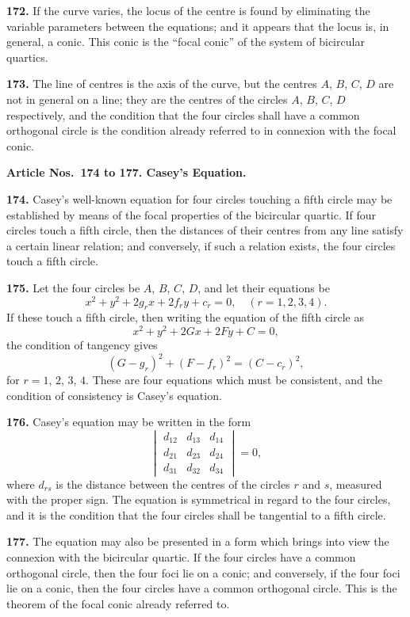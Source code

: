 \documentclass[12pt,a4paper]{article}
\theoremstyle{definition}
\begin{document}
\noindent\textbf{172.} If the curve varies, the locus of the centre is found by eliminating the
variable parameters between the equations; and it appears that the locus is, in general,
a conic. This conic is the ``focal conic'' of the system of bicircular quartics.

\newpage
\noindent\textbf{173.} The line of centres is the axis of the curve, but the centres $A$, $B$, $C$, $D$
are not in general on a line; they are the centres of the circles $A$, $B$, $C$, $D$ respectively,
and the condition that the four circles shall have a common orthogonal circle is the
condition already referred to in connexion with the focal conic.

\vspace{0.5em}
\noindent\textbf{Article Nos.~174 to 177. Casey's Equation.}

\vspace{0.3em}
\noindent\textbf{174.} Casey's well-known equation for four circles touching a fifth circle may
be established by means of the focal properties of the bicircular quartic. If four circles
touch a fifth circle, then the distances of their centres from any line satisfy a certain
linear relation; and conversely, if such a relation exists, the four circles touch a fifth circle.

\noindent\textbf{175.} Let the four circles be $A$, $B$, $C$, $D$, and let their equations be
\[
x^2 + y^2 + 2g_rx + 2f_ry + c_r = 0, \quad (r = 1, 2, 3, 4).
\]
If these touch a fifth circle, then writing the equation of the fifth circle as
\[
x^2 + y^2 + 2Gx + 2Fy + C = 0,
\]
the condition of tangency gives
\[
(G - g_r)^2 + (F - f_r)^2 = (C - c_r)^2,
\]
for $r = 1$, $2$, $3$, $4$. These are four equations which must be consistent, and the condition
of consistency is Casey's equation.

\newpage
\noindent\textbf{176.} Casey's equation may be written in the form
\[
\begin{vmatrix}
d_{12} & d_{13} & d_{14} \\
d_{21} & d_{23} & d_{24} \\
d_{31} & d_{32} & d_{34}
\end{vmatrix}
= 0,
\]
where $d_{rs}$ is the distance between the centres of the circles $r$ and $s$, measured with
the proper sign. The equation is symmetrical in regard to the four circles, and it is
the condition that the four circles shall be tangential to a fifth circle.

\noindent\textbf{177.} The equation may also be presented in a form which brings into view
the connexion with the bicircular quartic. If the four circles have a common orthogonal
circle, then the four foci lie on a conic; and conversely, if the four foci lie on a conic,
then the four circles have a common orthogonal circle. This is the theorem of the
focal conic already referred to.
\end{document}
